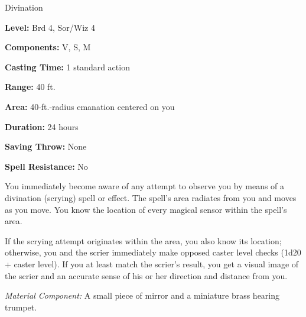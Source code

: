 
Divination

\textbf{Level:} Brd 4, Sor/Wiz 4

\textbf{Components:} V, S, M

\textbf{Casting Time:} 1 standard action

\textbf{Range:} 40 ft.

\textbf{Area:} 40-ft.-radius emanation centered on you

\textbf{Duration:} 24 hours

\textbf{Saving Throw:} None

\textbf{Spell Resistance:} No

You immediately become aware of any attempt to observe you by means of a divination 
(scrying) spell or effect. The spell's area radiates from you and moves as you 
move. You know the location of every magical sensor within the spell's area.

If the scrying attempt originates within the area, you also know its location; 
otherwise, you and the scrier immediately make opposed caster level checks (1d20 
+ caster level). If you at least match the scrier's result, you get a visual image 
of the scrier and an accurate sense of his or her direction and distance from you.

\textit{Material Component:} A small piece of mirror and a miniature brass hearing 
trumpet.

